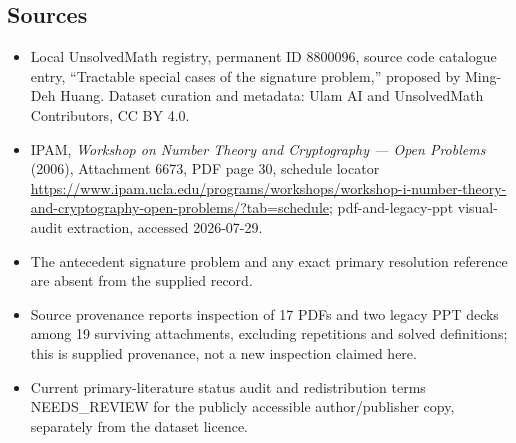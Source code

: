 \documentclass[11pt]{article}
\begin{document}
\subsection{Sources}
\begin{itemize}
\item Local UnsolvedMath registry, permanent ID 8800096, source code catalogue entry, ``Tractable special cases of the signature problem,'' proposed by Ming-Deh Huang. Dataset curation and metadata: Ulam AI and UnsolvedMath Contributors, CC BY 4.0.
\item IPAM, \emph{Workshop on Number Theory and Cryptography --- Open Problems} (2006), Attachment 6673, PDF page 30, schedule locator \url{https://www.ipam.ucla.edu/programs/workshops/workshop-i-number-theory-and-cryptography-open-problems/?tab=schedule}; pdf-and-legacy-ppt visual-audit extraction, accessed 2026-07-29.
\item The antecedent signature problem and any exact primary resolution reference are absent from the supplied record.
\item Source provenance reports inspection of 17 PDFs and two legacy PPT decks among 19 surviving attachments, excluding repetitions and solved definitions; this is supplied provenance, not a new inspection claimed here.
\item Current primary-literature status audit and redistribution terms NEEDS\_REVIEW for the publicly accessible author/publisher copy, separately from the dataset licence.
\end{itemize}
\end{document}
